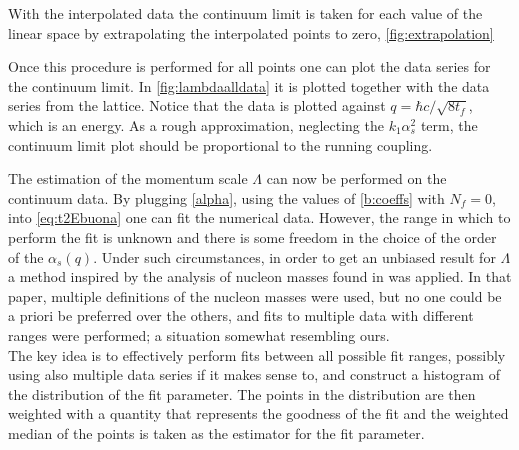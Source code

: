 
With the interpolated data the continuum limit is taken for each value of the linear space by extrapolating the interpolated points to zero, \cref{fig:extrapolation}

Once this procedure is performed for all points one can plot the data series for the continuum limit. In \cref{fig:lambdaalldata} it is plotted together with the data series from the lattice. Notice that the data is plotted against $q=\hbar c / \sqrt{8t_f}$, which is an energy. As a rough approximation, neglecting the $k_1\alpha_s^2$ term, the continuum limit plot should be proportional to the running coupling.


The estimation of the momentum scale $\Lambda$ can now be performed on the continuum data. By plugging \cref{alpha}, using the values of \cref{b:coeffs} with $N_f = 0$, into \cref{eq:t2Ebuona} one can fit the numerical data. However, the range in which to perform the fit is unknown and there is some freedom in the choice of the order of the $\alpha_s(q)$. Under such circumstances, in order to get an unbiased result for  $\Lambda$ a method inspired by the analysis of nucleon masses found in \cite{durr_ab-initio_2008}  was applied. In that paper, multiple definitions of the nucleon masses were used, but no one could be a priori be preferred over the others, and fits to multiple data with different ranges were performed; a situation somewhat resembling ours.\\
The key idea is to effectively perform fits between all possible fit ranges, possibly using also multiple data series if it makes sense to, and construct a histogram of the distribution of the fit parameter. The points in the distribution are then weighted with a quantity that represents the goodness of the fit and the weighted median of the points is taken as the estimator for the fit parameter.

